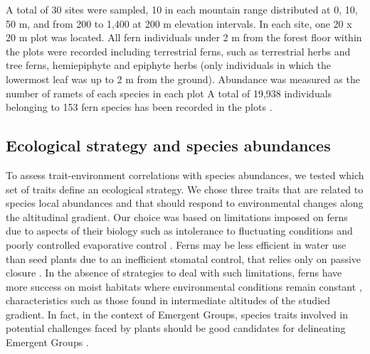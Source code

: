 \documentclass[12pt]{article}
\begin{document}
A total of 30 sites were sampled, 10 in each mountain range %
distributed at 0, 10, 50 m, and from 200 to 1,400 at 200 m elevation
intervals. In each site, one 20 x 20 m plot was
located. %
All fern individuals under 2 m from the forest floor
within the plots were recorded %
including terrestrial ferns, such as terrestrial herbs and tree ferns,
hemiepiphyte and epiphyte herbs (only individuals in which the
lowermost leaf was up to 2 m from the ground).
Abundance was measured
as the number of ramets of each species in each plot %
A total of 19,938 individuals belonging to 153 fern species has been recorded in the plots \cite{Paciencia2008}.

\subsection*{Ecological strategy and species abundances}

To assess trait-environment correlations with species
abundances, we tested which set of traits define an ecological
strategy. We chose three traits that are related to species local
abundances and that should respond to environmental changes along the
altitudinal gradient.  Our choice was based on limitations imposed on
ferns due to aspects of their biology such as intolerance to
fluctuating conditions and poorly controlled evaporative control
\citep{Page2002}. Ferns may be less efficient in water use than seed
plants due to an inefficient stomatal control, that relies only on
passive closure \citep{Brodribb2011}.  In the absence of strategies to
deal with such limitations, ferns have more success on moist habitats
where environmental conditions remain constant \citep{Page2002},
characteristics such as those found in intermediate altitudes of the
studied gradient.  In fact, in the context of Emergent Groups, species
traits involved in potential challenges faced by plants should be good
candidates for delineating Emergent Groups \citep{Herault2007}.
\end{document}
